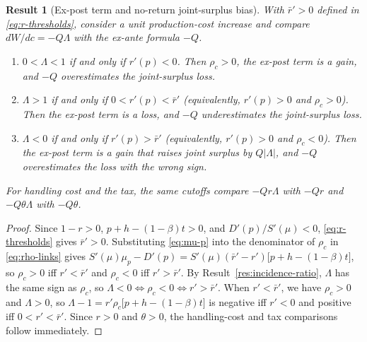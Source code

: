 \documentclass[11pt]{article}
\newtheorem{result}{Result}
\begin{document}
\begin{result}[Ex-post term and no-return joint-surplus bias]
\label{res:welfare-bias}
\label{res:expost-r}
With $\bar{r}'>0$ defined in \eqref{eq:r-thresholds}, consider a unit
production-cost increase and compare $dW/dc=-Q\Lambda$ with the ex-ante
formula $-Q$.
\begin{enumerate}
\item[(i)] $0<\Lambda<1$ if and only if $r'(p)<0$. Then $\rho_c>0$, the
ex-post term is a gain, and $-Q$ overestimates the joint-surplus loss.
\item[(ii)] $\Lambda>1$ if and only if $0<r'(p)<\bar{r}'$ (equivalently,
$r'(p)>0$ and $\rho_c>0$). Then the ex-post term is a loss, and $-Q$
underestimates the joint-surplus loss.
\item[(iii)] $\Lambda<0$ if and only if $r'(p)>\bar{r}'$ (equivalently,
$r'(p)>0$ and $\rho_c<0$). Then the ex-post term is a gain that raises joint
surplus by $Q|\Lambda|$, and $-Q$ overestimates the loss with the wrong sign.
\end{enumerate}
For handling cost and the tax, the same cutoffs compare $-Qr\Lambda$ with
$-Qr$ and $-Q\theta\Lambda$ with $-Q\theta$.
\end{result}
\begin{proof}
Since $1-r>0$, $p+h-(1-\beta)t>0$, and $D'(p)/S'(\mu)<0$,
\eqref{eq:r-thresholds} gives $\bar{r}'>0$. Substituting \eqref{eq:mu-p} into
the denominator of $\rho_c$ in \eqref{eq:rho-links} gives
$S'(\mu)\mu_p-D'(p)=S'(\mu)(\bar{r}'-r')\bigl[p+h-(1-\beta)t\bigr]$, so
$\rho_c>0$ iff $r'<\bar{r}'$ and $\rho_c<0$ iff $r'>\bar{r}'$. By
Result~\ref{res:incidence-ratio}, $\Lambda$ has the same sign as $\rho_c$, so
$\Lambda<0\iff \rho_c<0\iff r'>\bar{r}'$. When $r'<\bar{r}'$, we have
$\rho_c>0$ and $\Lambda>0$, so $\Lambda-1=r'\rho_c\bigl[p+h-(1-\beta)t\bigr]$
is negative iff $r'<0$ and positive iff $0<r'<\bar{r}'$. Since $r>0$ and
$\theta>0$, the handling-cost and tax comparisons follow immediately.
\end{proof}
\end{document}
